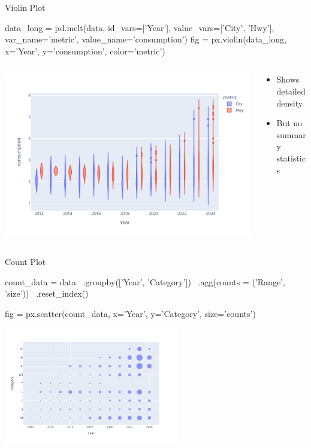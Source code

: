 \documentclass[ignorenonframetext,xcolor=x11names]{beamer}
\begin{document}
\begin{frame}[fragile]{Violin Plot}
\footnotesize
\begin{pythoncode}
data_long = pd.melt(data, 
    id_vars=['Year'], value_vars=['City', 'Hwy'], 
    var_name='metric', value_name='consumption')
fig = px.violin(data_long, 
                x='Year', y='consumption', color='metric')
\end{pythoncode}
\begin{columns}
\begin{column}{.75\textwidth}
  \includegraphics[width=\textwidth]{px.fuel.violin.pdf}
\end{column}
\begin{column}{.35\textwidth}
\footnotesize
\begin{itemize}
   \item Shows detailed density
   \item But no summary statistics
\end{itemize}
\end{column}
\end{columns}
\end{frame}

\begin{frame}[fragile]{Count Plot}
\footnotesize
\begin{pythoncode}
count_data = data \
   .groupby(['Year', 'Category']) \
   .agg(counts = ('Range', 'size')) \
   .reset_index()

fig = px.scatter(count_data, x='Year', y='Category', size='counts')
\end{pythoncode}
\begin{center}
  \includegraphics[height=2in]{px.fuel.count.pdf}
\end{center}
\end{frame}
\end{document}
